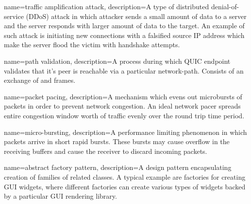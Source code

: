 {
  name=traffic amplification attack,
  description={A type of distributed denial-of-service (DDoS) attack in which attacker sends a small amount of data to a server and the server responds with larger amount of data to the target. An example of such attack is initiating new connections with a falsified source IP address which make the server flood the victim with handshake attempts.}
}

{
  name=path validation,
  description={A process during which QUIC endpoint validates that it's peer is reachable via a particular \gls{network-path}. Consists of an exchange of \PATHCHALLENGE{} and \PATHRESPONSE{} frames.}
}

{
  name=packet pacing,
  description={A mechanism which evens out microbursts of packets in order to prevent network congestion. An ideal network pacer spreads entire congestion window worth of traffic evenly over the round trip time period.}
}

{
  name=micro-bursting,
  description={A performance limiting phenomenon in which packets arrive in short rapid bursts. These bursts may cause overflow in the receiving buffers and cause the receiver to discard incoming packets.}
}

{
  name=abstract factory pattern,
  description={A design pattern encapsulating creation of families of related classes. A typical example are factories for creating GUI widgets, where different factories can create various types of widgets backed by a particular GUI rendering library.}
}






